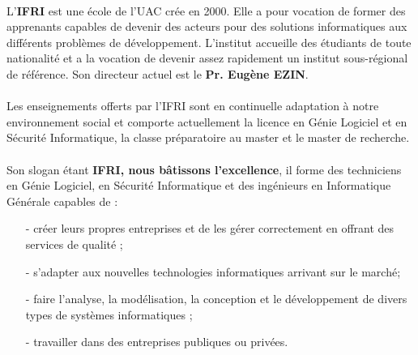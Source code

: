 \documentclass[12pt]{report}
\begin{document}
      \paragraph{}
	L’\textbf{\gls{IFRI}} est une école de l'\gls{UAC} crée en 2000. Elle a pour vocation de former des apprenants capables de devenir des acteurs pour des solutions informatiques aux différents problèmes de développement. L’institut accueille des étudiants de toute nationalité et a la vocation de devenir assez rapidement un institut sous-régional de référence. Son directeur actuel est le \textbf{Pr. Eugène EZIN}.
      \paragraph{}
	Les enseignements offerts par l’\gls{IFRI} sont en continuelle adaptation à notre environnement social et comporte actuellement la licence en Génie Logiciel et en Sécurité Informatique, la classe préparatoire au master et le master de recherche.
      \paragraph{}
	Son slogan étant \textbf{ \gls{IFRI}, nous bâtissons l’excellence}, il forme des techniciens en Génie Logiciel, en Sécurité Informatique et des ingénieurs en Informatique Générale capables de :
	\begin{itemize}
	  \item[-] créer leurs propres entreprises et de les gérer correctement en offrant des services de qualité ;
	  \item[-] s'adapter aux nouvelles technologies informatiques arrivant sur le marché;
	  \item[-] faire l'analyse, la modélisation, la conception et le développement de divers types de systèmes informatiques ;
	  \item[-] travailler dans des entreprises publiques ou privées.
	\end{itemize}
      
\end{document}
